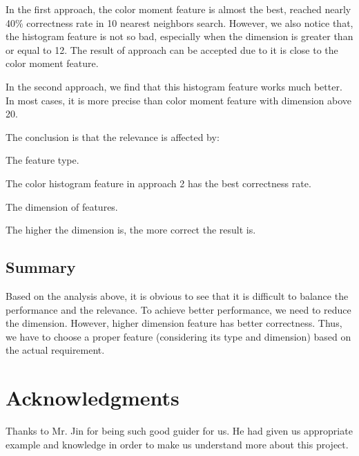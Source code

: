\documentclass{acm_proc_article-sp}
\begin{document}
In the first approach, the color moment feature is almost the best, reached nearly 40\% correctness rate in 10 nearest neighbors search. However, we also notice that, the histogram feature is not so bad, especially when the dimension is greater than or equal to 12. The result of approach can be accepted due to it is close to the color moment feature.

In the second approach, we find that this histogram feature works much better. In most cases, it is more precise than color moment feature with dimension above 20.

The conclusion is that the relevance is affected by:

\begin{itemize*}
 \item The feature type.

 The color histogram feature in approach 2 has the best correctness rate.

 \item The dimension of features.

 The higher the dimension is, the more correct the result is.
\end{itemize*}

\subsection{Summary}
Based on the analysis above, it is obvious to see that it is difficult to balance the performance and the relevance. To achieve better performance, we need to reduce the dimension. However, higher dimension feature has better correctness. Thus, we have to choose a proper feature (considering its type and dimension) based on the actual requirement.

\section{Acknowledgments}
Thanks to Mr. Jin for being such good guider for us. He had given us appropriate example and knowledge in order to make us understand more about this project.





\end{document}
